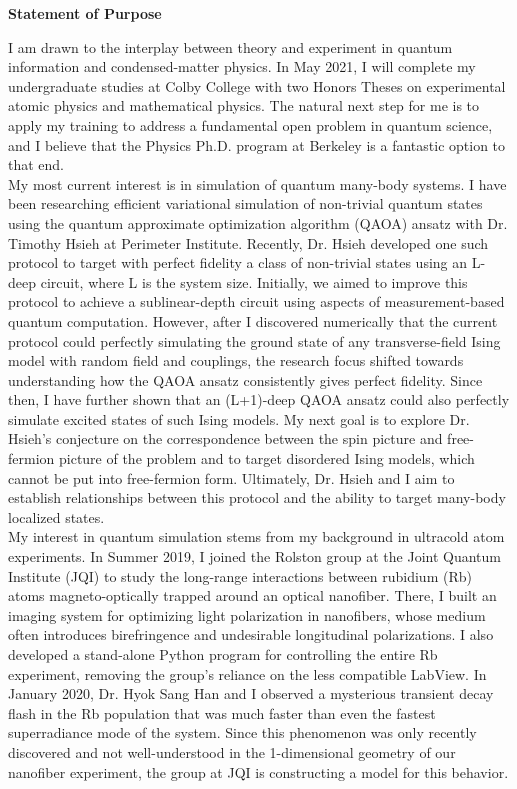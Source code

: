 \documentclass[12pt]{article}
\begin{document}
\begin{center}
	\textbf{Statement of Purpose}
\end{center}
I am drawn to the interplay between theory and experiment in quantum information and condensed-matter physics. In May 2021, I will complete my undergraduate studies at Colby College with two Honors Theses on experimental atomic physics and mathematical physics. The natural next step for me is to apply my training to address a fundamental open problem in quantum science, and I believe that the Physics Ph.D. program at Berkeley is a fantastic option to that end.  \\ 

My most current interest is in simulation of quantum many-body systems. I have been researching efficient variational simulation of non-trivial quantum states using the quantum approximate optimization algorithm (QAOA) ansatz with Dr. Timothy Hsieh at Perimeter Institute. Recently, Dr. Hsieh developed one such protocol to target with perfect fidelity a class of non-trivial states using an L-deep circuit, where L is the system size. Initially, we aimed to improve this protocol to achieve a sublinear-depth circuit using aspects of measurement-based quantum computation. However, after I discovered numerically that the current protocol could perfectly simulating the ground state of any transverse-field Ising model with random field and couplings, the research focus shifted towards understanding how the QAOA ansatz consistently gives perfect fidelity. Since then, I have further shown that an (L+1)-deep QAOA ansatz could also perfectly simulate excited states of such Ising models. My next goal is to explore Dr. Hsieh's conjecture on the correspondence between the spin picture and free-fermion picture of the problem and to target disordered Ising models, which cannot be put into free-fermion form. Ultimately, Dr. Hsieh and I aim to establish relationships between this protocol and the ability to target many-body localized states.\\

My interest in quantum simulation stems from my background in ultracold atom experiments. In Summer 2019, I joined the Rolston group at the Joint Quantum Institute (JQI) to study the long-range interactions between rubidium (Rb) atoms magneto-optically trapped around an optical nanofiber. There, I built an imaging system for optimizing light polarization in nanofibers, whose medium often introduces birefringence and undesirable longitudinal polarizations. I also developed a stand-alone Python program for controlling the entire Rb experiment, removing the group's reliance on the less compatible LabView. In January 2020, Dr. Hyok Sang Han and I observed a mysterious transient decay flash in the Rb population that was much faster than even the fastest superradiance mode of the system. Since this phenomenon was only recently discovered and not well-understood in the 1-dimensional geometry of our nanofiber experiment, the group at JQI is constructing a model for this behavior.   \\ 
\end{document}
